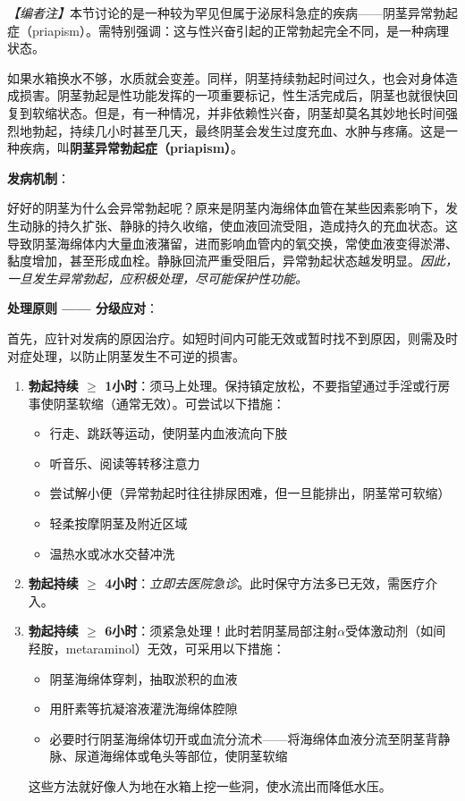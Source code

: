 \noindent\textit{【编者注】}本节讨论的是一种较为罕见但属于泌尿科急症的疾病——阴茎异常勃起症（priapism）。需特别强调：这与性兴奋引起的正常勃起完全不同，是一种病理状态。

\vspace{0.5em}
如果水箱换水不够，水质就会变差。同样，阴茎持续勃起时间过久，也会对身体造成损害。阴茎勃起是性功能发挥的一项重要标记，性生活完成后，阴茎也就很快回复到软缩状态。但是，有一种情况，并非依赖性兴奋，阴茎却莫名其妙地长时间强烈地勃起，持续几小时甚至几天，最终阴茎会发生过度充血、水肿与疼痛。这是一种疾病，叫\textbf{阴茎异常勃起症（priapism）}。

\vspace{0.5em}
\noindent\textbf{发病机制}：

好好的阴茎为什么会异常勃起呢？原来是阴茎内海绵体血管在某些因素影响下，发生动脉的持久扩张、静脉的持久收缩，使血液回流受阻，造成持久的充血状态。这导致阴茎海绵体内大量血液潴留，进而影响血管内的氧交换，常使血液变得淤滞、黏度增加，甚至形成血栓。静脉回流严重受阻后，异常勃起状态越发明显。\textit{因此，一旦发生异常勃起，应积极处理，尽可能保护性功能。}

\vspace{0.5em}
\noindent\textbf{处理原则 —— 分级应对}：

首先，应针对发病的原因治疗。如短时间内可能无效或暂时找不到原因，则需及时对症处理，以防止阴茎发生不可逆的损害。

\begin{enumerate}
	\item \textbf{勃起持续 $\geq$ 1小时}：须马上处理。保持镇定放松，不要指望通过手淫或行房事使阴茎软缩（通常无效）。可尝试以下措施：
	\begin{itemize}
		\item 行走、跳跃等运动，使阴茎内血液流向下肢
		\item 听音乐、阅读等转移注意力
		\item 尝试解小便（异常勃起时往往排尿困难，但一旦能排出，阴茎常可软缩）
		\item 轻柔按摩阴茎及附近区域
		\item 温热水或冰水交替冲洗
	\end{itemize}

	\item \textbf{勃起持续 $\geq$ 4小时}：\textit{立即去医院急诊}。此时保守方法多已无效，需医疗介入。

	\item \textbf{勃起持续 $\geq$ 6小时}：须紧急处理！此时若阴茎局部注射$\alpha$受体激动剂（如间羟胺，metaraminol）无效，可采用以下措施：
	\begin{itemize}
		\item 阴茎海绵体穿刺，抽取淤积的血液
		\item 用肝素等抗凝溶液灌洗海绵体腔隙
		\item 必要时行阴茎海绵体切开或血流分流术——将海绵体血液分流至阴茎背静脉、尿道海绵体或龟头等部位，使阴茎软缩
	\end{itemize}
	这些方法就好像人为地在水箱上挖一些洞，使水流出而降低水压。
\end{enumerate}

